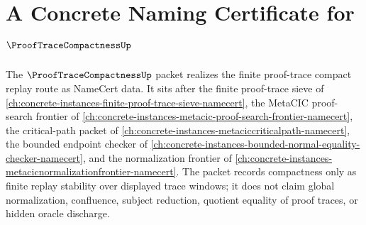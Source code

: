 \chapter{A Concrete Naming Certificate for $\ProofTraceCompactnessUp$}
\label{ch:concrete-instances-proof-trace-compactness-namecert}

The $\ProofTraceCompactnessUp$ packet realizes the finite proof-trace compact replay route as NameCert data. It sits after the finite proof-trace sieve of \autoref{ch:concrete-instances-finite-proof-trace-sieve-namecert}, the MetaCIC proof-search frontier of \autoref{ch:concrete-instances-metacic-proof-search-frontier-namecert}, the critical-path packet of \autoref{ch:concrete-instances-metaciccriticalpath-namecert}, the bounded endpoint checker of \autoref{ch:concrete-instances-bounded-normal-equality-checker-namecert}, and the normalization frontier of \autoref{ch:concrete-instances-metacicnormalizationfrontier-namecert}. The packet records compactness only as finite replay stability over displayed trace windows; it does not claim global normalization, confluence, subject reduction, quotient equality of proof traces, or hidden oracle discharge.

